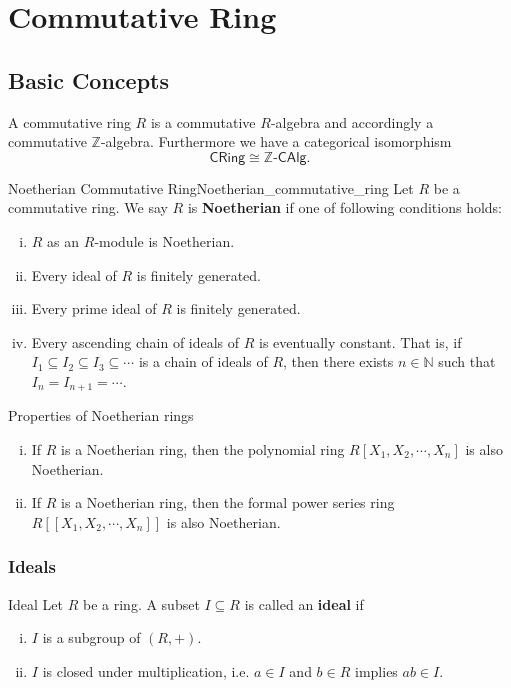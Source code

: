 \chapter{Commutative Ring}
\section{Basic Concepts}
A commutative ring $R$ is a commutative $R$-algebra and accordingly a commutative $\mathbb{Z}$-algebra. Furthermore we have a categorical isomorphism 
\[
    \mathsf{CRing}\cong \mathbb{Z}\text{-}\mathsf{CAlg}.
\]



\begin{definition}{Noetherian Commutative Ring}{Noetherian_commutative_ring}
    Let $R$ be a commutative ring. We say $R$ is \textbf{Noetherian} if one of following conditions holds:
    \begin{enumerate}[(i)]
        \item $R$ as an $R$-module is Noetherian.
        \item Every ideal of $R$ is finitely generated.
        \item Every prime ideal of $R$ is finitely generated.
        \item Every ascending chain of ideals of $R$ is eventually constant. That is, if $I_1\subseteq I_2\subseteq I_3\subseteq\cdots$ is a chain of ideals of $R$, then there exists $n\in\mathbb{N}$ such that $I_n=I_{n+1}=\cdots$.
    \end{enumerate}
\end{definition}

\begin{proposition}{Properties of Noetherian rings}{}
    \begin{enumerate}[(i)]
        \item If $R$ is a Noetherian ring, then the polynomial ring $R[X_1,X_2,\cdots,X_n]$ is also Noetherian.
        \item If $R$ is a Noetherian ring, then the  formal power series ring $R[[X_1,X_2,\cdots,X_n]]$ is also Noetherian.
    \end{enumerate}
\end{proposition}


\subsection{Ideals}
\begin{definition}{Ideal}{}
    Let $R$ be a ring. A subset $I\subseteq R$ is called an \textbf{ideal} if
    \begin{enumerate}[(i)]
        \item $I$ is a subgroup of $(R,+)$.
        \item $I$ is closed under multiplication, i.e. $a\in I$ and $b\in R$ implies $ab\in I$.
    \end{enumerate}
\end{definition}


